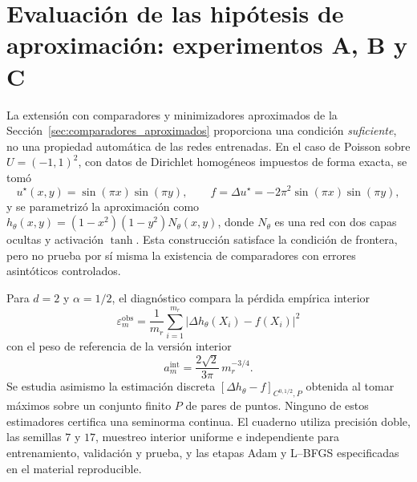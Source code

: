 \section{Evaluación de las hipótesis de aproximación: experimentos A, B y C}
\label{sec:experimentos_tanh_abc}

La extensión con comparadores y minimizadores aproximados de la
Sección~\ref{sec:comparadores_aproximados} proporciona una condición
\emph{suficiente}, no una propiedad automática de las redes entrenadas.
En el caso de Poisson sobre $U=(-1,1)^2$, con datos de Dirichlet
homogéneos impuestos de forma exacta, se tomó
\[
 u^\star(x,y)=\sin(\pi x)\sin(\pi y),\qquad
 f=\Delta u^\star=-2\pi^2\sin(\pi x)\sin(\pi y),
\]
y se parametrizó la aproximación como
$h_\theta(x,y)=(1-x^2)(1-y^2)N_\theta(x,y)$,
donde $N_\theta$ es una red con dos capas ocultas y activación
$\tanh$. Esta construcción satisface la condición de frontera, pero
no prueba por sí misma la existencia de comparadores con errores
asintóticos controlados.

Para $d=2$ y $\alpha=1/2$, el diagnóstico compara la pérdida empírica
interior
\[
 \varepsilon_m^{\mathrm{obs}}
 =\frac{1}{m_r}\sum_{i=1}^{m_r}
 \bigl|\Delta h_\theta(X_i)-f(X_i)\bigr|^2
\]
con el peso de referencia de la versión interior
\[
 a_m^{\mathrm{int}}=\frac{2\sqrt{2}}{3\pi}\,m_r^{-3/4}.
\]
Se estudia asimismo la estimación discreta
$[\Delta h_\theta-f]_{C^{0,1/2},P}$ obtenida al tomar máximos sobre
un conjunto finito $P$ de pares de puntos. Ninguno de estos
estimadores certifica una seminorma continua. El cuaderno utiliza
precisión doble, las semillas $7$ y $17$, muestreo interior uniforme
e independiente para entrenamiento, validación y prueba, y las etapas
Adam y L--BFGS especificadas en el material reproducible.

